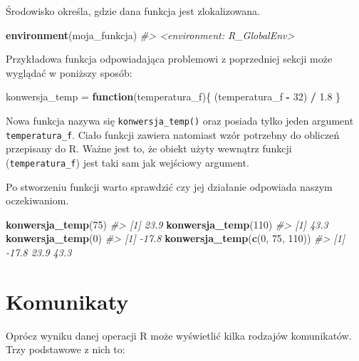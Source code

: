 \documentclass[paper=6in:9in,pagesize=pdftex,headinclude=on,footinclude=on,10pt]{scrbook}
\newenvironment{Shaded}{\begin{snugshade}}{\end{snugshade}}
\newcommand{\CommentTok}[1]{\textcolor[rgb]{0.56,0.35,0.01}{\textit{#1}}}
\newcommand{\ControlFlowTok}[1]{\textcolor[rgb]{0.13,0.29,0.53}{\textbf{#1}}}
\newcommand{\DecValTok}[1]{\textcolor[rgb]{0.00,0.00,0.81}{#1}}
\newcommand{\FloatTok}[1]{\textcolor[rgb]{0.00,0.00,0.81}{#1}}
\newcommand{\KeywordTok}[1]{\textcolor[rgb]{0.13,0.29,0.53}{\textbf{#1}}}
\newcommand{\NormalTok}[1]{#1}
\newcommand{\OperatorTok}[1]{\textcolor[rgb]{0.81,0.36,0.00}{\textbf{#1}}}
\newcommand{\StringTok}[1]{\textcolor[rgb]{0.31,0.60,0.02}{#1}}
\begin{document}
Środowisko określa, gdzie dana funkcja jest zlokalizowana.

\begin{Shaded}
\begin{Highlighting}[]
\KeywordTok{environment}\NormalTok{(moja_funkcja)}
\CommentTok{#> <environment: R_GlobalEnv>}
\end{Highlighting}
\end{Shaded}

Przykładowa funkcja odpowiadająca problemowi z poprzedniej sekcji może wyglądać w poniższy sposób:

\begin{Shaded}
\begin{Highlighting}[]
\NormalTok{konwersja_temp =}\StringTok{ }\ControlFlowTok{function}\NormalTok{(temperatura_f)\{}
\NormalTok{    (temperatura_f }\OperatorTok{-}\StringTok{ }\DecValTok{32}\NormalTok{) }\OperatorTok{/}\StringTok{ }\FloatTok{1.8}
\NormalTok{\}}
\end{Highlighting}
\end{Shaded}

Nowa funkcja nazywa się \texttt{konwersja\_temp()} oraz posiada tylko jeden argument \texttt{temperatura\_f}.
Ciało funkcji zawiera natomiast wzór potrzebny do obliczeń przepisany do R.
Ważne jest to, że obiekt użyty wewnątrz funkcji (\texttt{temperatura\_f}) jest taki sam jak wejściowy argument.

Po stworzeniu funkcji warto sprawdzić czy jej działanie odpowiada naszym oczekiwaniom.

\begin{Shaded}
\begin{Highlighting}[]
\KeywordTok{konwersja_temp}\NormalTok{(}\DecValTok{75}\NormalTok{)}
\CommentTok{#> [1] 23.9}
\KeywordTok{konwersja_temp}\NormalTok{(}\DecValTok{110}\NormalTok{)}
\CommentTok{#> [1] 43.3}
\KeywordTok{konwersja_temp}\NormalTok{(}\DecValTok{0}\NormalTok{)}
\CommentTok{#> [1] -17.8}
\KeywordTok{konwersja_temp}\NormalTok{(}\KeywordTok{c}\NormalTok{(}\DecValTok{0}\NormalTok{, }\DecValTok{75}\NormalTok{, }\DecValTok{110}\NormalTok{))}
\CommentTok{#> [1] -17.8  23.9  43.3}
\end{Highlighting}
\end{Shaded}

\hypertarget{komunikaty}{%
\section{Komunikaty}\label{komunikaty}}

Oprócz wyniku danej operacji R może wyświetlić kilka rodzajów komunikatów.
Trzy podstawowe z nich to:
\end{document}
